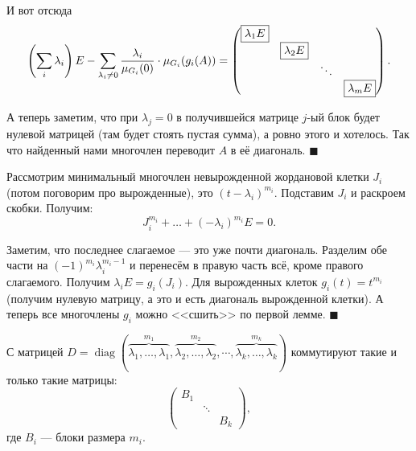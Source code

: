     И вот отсюда
    \[
        \left(\sum_i\lambda_i\right)E - \sum_{\lambda_i \ne 0}\frac{\lambda_i}{\mu_{G_i}(0)} \cdot \mu_{G_i}(g_i(A)) =
        \begin{pmatrix}
            \fbox{$\lambda_1E$} & & & \\
             & \fbox{$\lambda_2E$} & &\\
             & & \ddots &\\
             & & & \fbox{$\lambda_mE$}
        \end{pmatrix}.
    \]

    А теперь заметим, что при $\lambda_j = 0$ в получившейся матрице $j$-ый блок будет нулевой матрицей (там будет стоять пустая сумма), а ровно этого и хотелось. Так что найденный нами многочлен переводит $A$ в её диагональ.
\hfill$\blacksquare$\par\smallskip

\smallskip
{}
Рассмотрим минимальный многочлен невырожденной жордановой клетки $J_i$ (потом поговорим про вырожденные), это $(t - \lambda_i)^{m_i}$. Подставим $J_i$ и раскроем скобки. Получим:
\[
    J_i^{m_i} + \ldots + (-\lambda_i)^{m_i}E = 0.
\]

Заметим, что последнее слагаемое --- это уже почти диагональ. Разделим обе части на $(-1)^{m_i}\lambda_i^{m_i - 1}$ и перенесём в правую часть всё, кроме правого слагаемого. Получим $\lambda_iE = g_i(J_i)$. Для вырожденных клеток $g_i(t) = t^{m_i}$ (получим нулевую матрицу, а это и есть диагональ вырожденной клетки). А теперь все многочлены $g_i$ можно <<сшить>> по первой лемме.
\hfill$\blacksquare$\par\smallskip

\begin{lemma}
    С матрицей $D = \operatorname{diag}(\overbrace{\lambda_1, \ldots, \lambda_1}^{m_1}, \overbrace{\lambda_2, \ldots, \lambda_2}^{m_2}, \cdots, \overbrace{\lambda_k, \ldots, \lambda_k}^{m_k})$ коммутируют такие и только такие матрицы:
    \[
        \begin{pmatrix}
            B_1 & & \\
             & \ddots & \\
             & & B_k
        \end{pmatrix},
    \]
    где $B_i$ --- блоки размера $m_i$.
\end{lemma}

